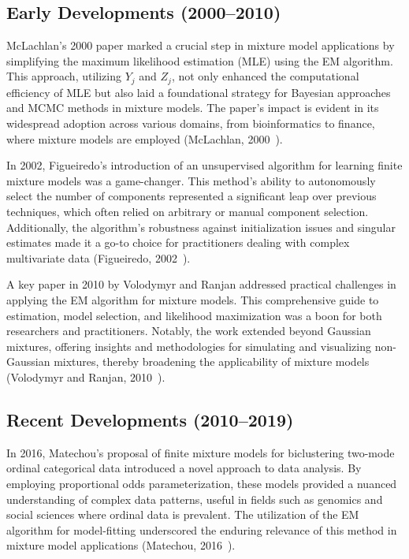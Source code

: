 \documentclass{article}
\begin{document}
\subsection*{Early Developments (2000--2010)}

McLachlan's 2000 paper marked a crucial step in mixture model applications by simplifying the maximum likelihood estimation (MLE) using the EM algorithm. This approach, utilizing $Y_j$ and $Z_j$, not only enhanced the computational efficiency of MLE but also laid a foundational strategy for Bayesian approaches and MCMC methods in mixture models. The paper’s impact is evident in its widespread adoption across various domains, from bioinformatics to finance, where mixture models are employed (McLachlan, 2000~\cite{mclachlan2000finite}).

In 2002, Figueiredo's introduction of an unsupervised algorithm for learning finite mixture models was a game-changer. This method's ability to autonomously select the number of components represented a significant leap over previous techniques, which often relied on arbitrary or manual component selection. Additionally, the algorithm's robustness against initialization issues and singular estimates made it a go-to choice for practitioners dealing with complex multivariate data (Figueiredo, 2002~\cite{figueiredo2002unsupervised}).

A key paper in 2010 by Volodymyr and Ranjan addressed practical challenges in applying the EM algorithm for mixture models. This comprehensive guide to estimation, model selection, and likelihood maximization was a boon for both researchers and practitioners. Notably, the work extended beyond Gaussian mixtures, offering insights and methodologies for simulating and visualizing non-Gaussian mixtures, thereby broadening the applicability of mixture models (Volodymyr and Ranjan, 2010~\cite{10.1214/09-SS053}).

\subsection*{Recent Developments (2010--2019)}

In 2016, Matechou's proposal of finite mixture models for biclustering two-mode ordinal categorical data introduced a novel approach to data analysis. By employing proportional odds parameterization, these models provided a nuanced understanding of complex data patterns, useful in fields such as genomics and social sciences where ordinal data is prevalent. The utilization of the EM algorithm for model-fitting underscored the enduring relevance of this method in mixture model applications (Matechou, 2016~\cite{matechou2016biclustering}).
\end{document}
